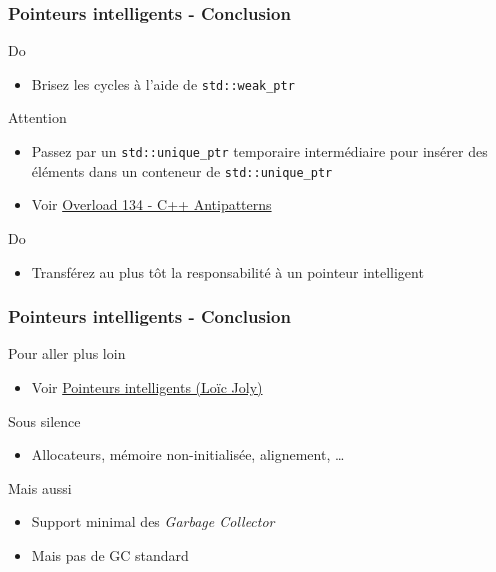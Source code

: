 \documentclass[C++.tex]{subfiles}
\begin{document}
\begin{frame}[fragile]
	\frametitle{Pointeurs intelligents - Conclusion}
	\begin{exampleblock}{Do}
		\begin{itemize}
			\item Brisez les cycles à l'aide de \lstinline|std::weak_ptr|
		\end{itemize}
	\end{exampleblock}

	\begin{alertblock}{Attention}
		\begin{itemize}
			\item Passez par un \lstinline|std::unique_ptr| temporaire intermédiaire pour insérer des éléments dans un conteneur de \lstinline|std::unique_ptr|
			\item Voir \href{https://accu.org/index.php/journals/2271}{Overload 134 - C++ Antipatterns}
		\end{itemize}

	\end{alertblock}

	\begin{exampleblock}{Do}
		\begin{itemize}
			\item Transférez au plus tôt la responsabilité à un pointeur intelligent
		\end{itemize}
	\end{exampleblock}
\end{frame}

\begin{frame}[fragile]
	\frametitle{Pointeurs intelligents - Conclusion}
	\begin{block}{Pour aller plus loin}
		\begin{itemize}
			\item Voir \href{http://loic-joly.developpez.com/tutoriels/cpp/smart-pointers/}{Pointeurs intelligents (Loïc Joly)}
		\end{itemize}
	\end{block}

	\begin{block}{Sous silence}
		\begin{itemize}
			\item Allocateurs, mémoire non-initialisée, alignement, \ldots
		\end{itemize} 
	\end{block}

	\begin{block}{Mais aussi}
	\begin{itemize}
		\item Support minimal des \textit{Garbage Collector}


		\item Mais pas de GC standard
	\end{itemize}
	\end{block}
\end{frame}
\end{document}
